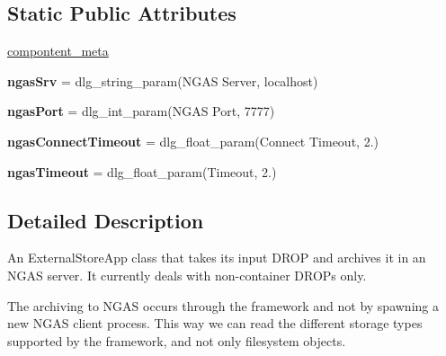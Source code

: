 \subsection*{Static Public Attributes}
\begin{DoxyCompactItemize}
\item 
\mbox{\hyperlink{classdlg_1_1apps_1_1archiving_1_1_ngas_archiving_app_a31d193eac7d450752df236321c8c2f25}{compontent\+\_\+meta}}
\item 
\mbox{\label{classdlg_1_1apps_1_1archiving_1_1_ngas_archiving_app_ab3e75ddc6c71ec97df248bd1ca423509}} 
{\bfseries ngas\+Srv} = dlg\+\_\+string\+\_\+param(\textquotesingle{}N\+G\+AS Server\textquotesingle{}, \textquotesingle{}localhost\textquotesingle{})
\item 
\mbox{\label{classdlg_1_1apps_1_1archiving_1_1_ngas_archiving_app_a0d4d3bdda39900d6cbda2203e05a1c4a}} 
{\bfseries ngas\+Port} = dlg\+\_\+int\+\_\+param(\textquotesingle{}N\+G\+AS Port\textquotesingle{}, 7777)
\item 
\mbox{\label{classdlg_1_1apps_1_1archiving_1_1_ngas_archiving_app_a33cded6e79b28ae159b1cd609e8063c5}} 
{\bfseries ngas\+Connect\+Timeout} = dlg\+\_\+float\+\_\+param(\textquotesingle{}Connect Timeout\textquotesingle{}, 2.)
\item 
\mbox{\label{classdlg_1_1apps_1_1archiving_1_1_ngas_archiving_app_a4355cd020b333098f4e5d9d2c732696c}} 
{\bfseries ngas\+Timeout} = dlg\+\_\+float\+\_\+param(\textquotesingle{}Timeout\textquotesingle{}, 2.)
\end{DoxyCompactItemize}


\subsection{Detailed Description}
\begin{DoxyVerb}An ExternalStoreApp class that takes its input DROP and archives it in
an NGAS server. It currently deals with non-container DROPs only.

The archiving to NGAS occurs through the framework and not by spawning a
new NGAS client process. This way we can read the different storage types
supported by the framework, and not only filesystem objects.
\end{DoxyVerb}
 

